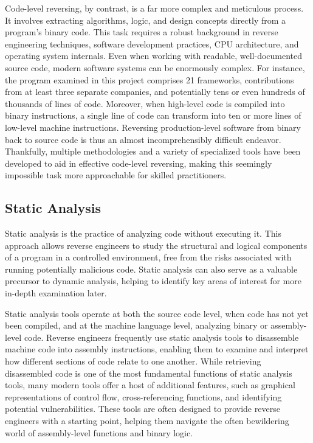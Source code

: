 Code-level reversing, by contrast, is a far more complex and meticulous process. It involves extracting algorithms, logic, and design concepts directly from a program’s binary code. This task requires a robust background in reverse engineering techniques, software development practices, CPU architecture, and operating system internals. Even when working with readable, well-documented source code, modern software systems can be enormously complex. For instance, the program examined in this project comprises 21 frameworks, contributions from at least three separate companies, and potentially tens or even hundreds of thousands of lines of code. Moreover, when high-level code is compiled into binary instructions, a single line of code can transform into ten or more lines of low-level machine instructions. Reversing production-level software from binary back to source code is thus an almost incomprehensibly difficult endeavor. Thankfully, multiple methodologies and a variety of specialized tools have been developed to aid in effective code-level reversing, making this seemingly impossible task more approachable for skilled practitioners.

\subsection{Static Analysis}

Static analysis is the practice of analyzing code without executing it. This approach allows reverse engineers to study the structural and logical components of a program in a controlled environment, free from the risks associated with running potentially malicious code. Static analysis can also serve as a valuable precursor to dynamic analysis, helping to identify key areas of interest for more in-depth examination later.

Static analysis tools operate at both the source code level, when code has not yet been compiled, and at the machine language level, analyzing binary or assembly-level code. Reverse engineers frequently use static analysis tools to disassemble machine code into assembly instructions, enabling them to examine and interpret how different sections of code relate to one another. While retrieving disassembled code is one of the most fundamental functions of static analysis tools, many modern tools offer a host of additional features, such as graphical representations of control flow, cross-referencing functions, and identifying potential vulnerabilities. These tools are often designed to provide reverse engineers with a starting point, helping them navigate the often bewildering world of assembly-level functions and binary logic.

